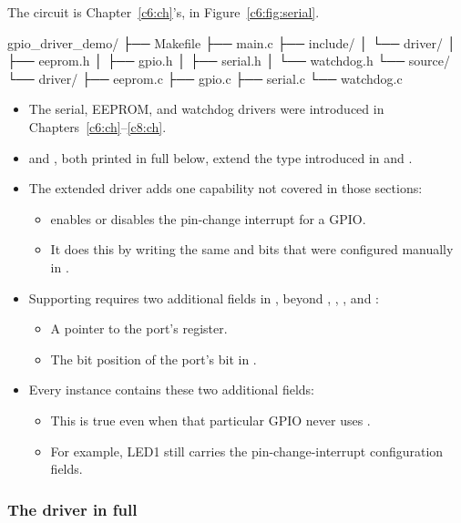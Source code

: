The circuit is Chapter~\ref{c6:ch}'s, in Figure~\ref{c6:fig:serial}.

\begin{console}
gpio_driver_demo/
├── Makefile
├── main.c
├── include/
│   └── driver/
│       ├── eeprom.h
│       ├── gpio.h
│       ├── serial.h
│       └── watchdog.h
└── source/
    └── driver/
        ├── eeprom.c
        ├── gpio.c
        ├── serial.c
        └── watchdog.c
\end{console}

\begin{itemize}
  \item The serial, EEPROM, and watchdog drivers were introduced in
    Chapters~\ref{c6:ch}--\ref{c8:ch}.
  \item {} and , both printed in full below, extend the
     type introduced in  and .
  \item The extended driver adds one capability not covered in those sections:
  \begin{itemize}
    \item {} enables or disables the pin-change interrupt for a GPIO.
    \item It does this by writing the same  and  bits that were
      configured manually in .
  \end{itemize}
  \item Supporting  requires two additional fields in ,
    beyond , , , and :
  \begin{itemize}
    \item A pointer to the port's  register.
    \item The bit position of the port's  bit in .
  \end{itemize}
  \item Every  instance contains these two additional fields:
  \begin{itemize}
    \item This is true even when that particular GPIO never uses .
    \item For example, LED1 still carries the pin-change-interrupt configuration fields.
  \end{itemize}
\end{itemize}

\subsubsection{The driver in full}

